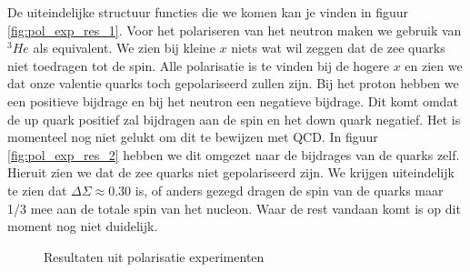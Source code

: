 \documentclass[../main.tex]{subfiles}
\begin{document}
De uiteindelijke structuur functies die we komen kan je vinden in figuur \ref{fig:pol_exp_res_1}. Voor het polariseren van het neutron maken we gebruik van $^3He$ als equivalent. We zien bij kleine $x$ niets wat wil zeggen dat de zee quarks niet toedragen tot de spin. Alle polarisatie is te vinden bij de hogere $x$ en zien we dat onze valentie quarks toch gepolariseerd zullen zijn. Bij het proton hebben we een positieve bijdrage en bij het neutron een negatieve bijdrage. Dit komt omdat de up quark positief zal bijdragen aan de spin en het down quark negatief. Het is momenteel nog niet gelukt om dit te bewijzen met QCD. In figuur \ref{fig:pol_exp_res_2} hebben we dit omgezet naar de bijdrages van de quarks zelf. Hieruit zien we dat de zee quarks niet gepolariseerd zijn. We krijgen uiteindelijk te zien dat $\Delta\Sigma \approx 0.30$ is, of anders gezegd dragen de spin van de quarks maar 1/3 mee aan de totale spin van het nucleon. Waar de rest vandaan komt is op dit moment nog niet duidelijk.

\begin{figure}[h]
    \centering
    \hfill
    \caption{Resultaten uit polarisatie experimenten}
\end{figure}
\end{document}
